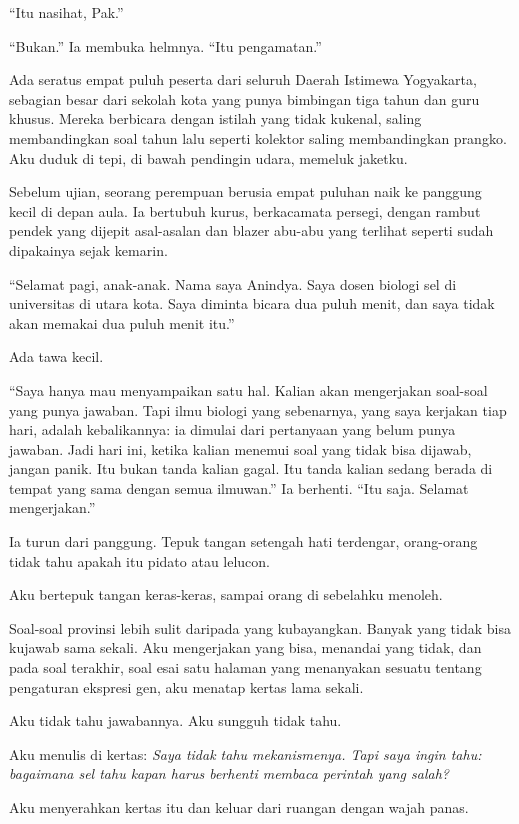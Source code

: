 \documentclass[11pt,twoside,openany]{book}
\makeatletter
\newcommand{\scenebreak}{\par\vspace{0.9em}{\centering\textsc{*\hspace{0.7em}*\hspace{0.7em}*}\par}\vspace{0.9em}\@afterindentfalse\@afterheading}
\makeatother
\begin{document}
``Itu nasihat, Pak.''

``Bukan.'' Ia membuka helmnya. ``Itu pengamatan.''

Ada seratus empat puluh peserta dari seluruh Daerah Istimewa Yogyakarta, sebagian besar dari sekolah kota yang punya bimbingan tiga tahun dan guru khusus. Mereka berbicara dengan istilah yang tidak kukenal, saling membandingkan soal tahun lalu seperti kolektor saling membandingkan prangko. Aku duduk di tepi, di bawah pendingin udara, memeluk jaketku.

Sebelum ujian, seorang perempuan berusia empat puluhan naik ke panggung kecil di depan aula. Ia bertubuh kurus, berkacamata persegi, dengan rambut pendek yang dijepit asal-asalan dan blazer abu-abu yang terlihat seperti sudah dipakainya sejak kemarin.

``Selamat pagi, anak-anak. Nama saya Anindya. Saya dosen biologi sel di universitas di utara kota. Saya diminta bicara dua puluh menit, dan saya tidak akan memakai dua puluh menit itu.''

Ada tawa kecil.

``Saya hanya mau menyampaikan satu hal. Kalian akan mengerjakan soal-soal yang punya jawaban. Tapi ilmu biologi yang sebenarnya, yang saya kerjakan tiap hari, adalah kebalikannya: ia dimulai dari pertanyaan yang belum punya jawaban. Jadi hari ini, ketika kalian menemui soal yang tidak bisa dijawab, jangan panik. Itu bukan tanda kalian gagal. Itu tanda kalian sedang berada di tempat yang sama dengan semua ilmuwan.'' Ia berhenti. ``Itu saja. Selamat mengerjakan.''

Ia turun dari panggung. Tepuk tangan setengah hati terdengar, orang-orang tidak tahu apakah itu pidato atau lelucon.

Aku bertepuk tangan keras-keras, sampai orang di sebelahku menoleh.

\scenebreak
Soal-soal provinsi lebih sulit daripada yang kubayangkan. Banyak yang tidak bisa kujawab sama sekali. Aku mengerjakan yang bisa, menandai yang tidak, dan pada soal terakhir, soal esai satu halaman yang menanyakan sesuatu tentang pengaturan ekspresi gen, aku menatap kertas lama sekali.

Aku tidak tahu jawabannya. Aku sungguh tidak tahu.

Aku menulis di kertas: \emph{Saya tidak tahu mekanismenya. Tapi saya ingin tahu: bagaimana sel tahu kapan harus berhenti membaca perintah yang salah?}

Aku menyerahkan kertas itu dan keluar dari ruangan dengan wajah panas.
\end{document}
